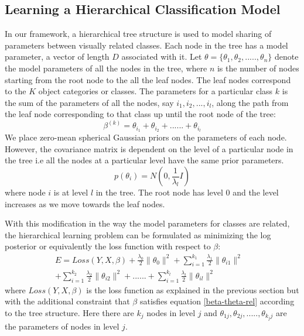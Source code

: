 \documentclass[10pt,twocolumn,letterpaper]{article}
\begin{document}
\subsection{Learning a Hierarchical Classification Model}
In our framework, a hierarchical tree structure is used to model sharing of parameters between 
visually related classes. Each node in the tree has a model parameter, a vector of length $D$ 
associated with it.  Let $ \theta = \{ \theta_{1}, \theta_{2},.....,\theta_{n}\} $ denote the model parameters 
of all the nodes in the tree, where $n$ is the number of nodes starting from the root node to the all the leaf nodes.
The leaf nodes correspond to the $K$ object categories or classes. The parameters for a particular class $k$
is the sum of the parameters of all the nodes, say $i_{1}, i_{2}, ..., i_{l} $, along the path from the leaf node
corresponding to that class up until the root node of the tree:
\begin{equation} \label{beta-theta-rel}
  \beta^{(k)} = \theta_{i_{1}} +  \theta_{i_{2}} + ...... + \theta_{i_{l}}
\end{equation} 
We place zero-mean spherical Gaussian priors on the parameters of each node. However, the 
covariance matrix is dependent on the level of a particular node in the tree i.e all the nodes at
a particular level have the same prior parameters.
\begin{equation}
  p(\theta_{i})  = N(0,\frac{1}{\lambda_{l}}I) 
\end{equation}   
where node $i$ is at level $l$ in the tree. The root node has level 0 and the level increases as 
we move towards the leaf nodes.

With this modification in the way the model parameters for classes are related,  the hierarchical 
learning problem can be formulated as minimizing the log posterior or equivalently the loss function 
with respect to $\beta$:
\begin{equation} \label{hier-loss}
  \begin{split}
    E = Loss(Y,X,\beta) + \frac{\lambda_{0}}{2} \|\theta_{0} \|^{2} +
    \sum_{i=1}^{k_{1}} \frac{\lambda_{1}}{2} \|\theta_{i1} \|^{2} & \\
    + \sum_{i=1}^{k_{2}} \frac{\lambda_{2}}{2} \|\theta_{i2} \|^{2} +
    ...... +
    \sum_{i=1}^{k_{l}} \frac{\lambda_{l}}{2} \|\theta_{il} \|^{2} &
  \end{split}
\end{equation} 
where $Loss(Y,X,\beta)$ is the loss function as explained in the previous section
but with the additional constraint that $\beta$ satisfies  equation \ref{beta-theta-rel} 
according to the tree structure. Here there are $k_{j}$ nodes in level $j$ and 
$\theta_{1j}, \theta_{2j},.....,\theta_{k_{j}j}$ are the parameters of nodes in level $j$.
\end{document}
